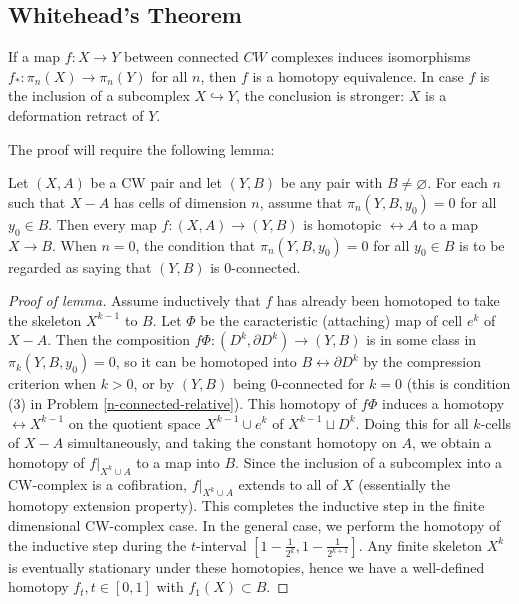 \subsection{Whitehead's Theorem}

\begin{theorem}\label{Thm:Whitehead}
    If a map $f \colon X \to Y$ between connected
    $CW$ complexes induces isomorphisms
    $f_* \colon \pi_n (X) \to \pi_n (Y)$ for all
    $n$, then $f$ is a homotopy equivalence.
    In case $f$ is the inclusion of a subcomplex
    $X \hookrightarrow Y$, the conclusion is stronger:
    $X$ is a deformation retract of $Y$.
\end{theorem}

The proof will require the following lemma:

\begin{lemma}\label{Compression-Lemma}
    Let $\left( X,A \right) $ be a CW pair and let
    $\left( Y, B \right) $ be any pair with
    $B \neq \varnothing$. For each  $n$ such that
    $X - A$ has cells of dimension $n$, assume
    that  $\pi_n \left( Y, B, y_0 \right) = 0$ for
    all $y_0 \in B$. Then every map $f \colon
    \left( X,A \right) \to \left( Y,B \right) $ is homotopic
    $\rel A$ to a map $X \to B$.
    When $n = 0$, the condition that
    $\pi_n \left( Y,B,y_0 \right) =0$ for all
    $y_0 \in B$ is to be regarded as saying that
    $\left( Y,B \right) $ is $0$-connected.
\end{lemma}

\begin{proof}[Proof of lemma]
    Assume inductively that $f$ has already been
    homotoped to take the skeleton
    $X^{k-1}$ to $B$. Let
    $\Phi$ be the caracteristic (attaching) map of 
    cell $e^{k}$ of $X - A$. Then the composition
    $f \Phi \colon \left( D^{k} , \partial D^{k} \right) 
    \to \left( Y,B \right) $ is in some class
    in $\pi_k \left( Y, B, y_0 \right) = 0$, so
    it can be homotoped into $B \rel \partial D^{k}$ by
    the compression criterion when
    $k > 0$, or
    by $\left( Y,B \right) $ being $0$-connected for
    $k = 0$ (this is condition (3) in Problem \ref{n-connected-relative}).
    This homotopy of $f \Phi$ induces a homotopy
    $\rel X^{k-1}$ on the quotient space
    $X^{k-1} \cup e^{k}$ of $X^{k-1} \sqcup D^{k}$.
    Doing this for all $k$-cells of $X-A$ simultaneously, and
    taking the constant homotopy on $A$, we obtain a
    homotopy of $f|_{X^{k} \cup A}$ to a map into
    $B$. Since the inclusion of a
    subcomplex into a CW-complex is a cofibration,
    $f|_{X^{k} \cup  A}$ extends to all of $X$ (essentially
    the homotopy extension property).
    This completes the inductive step in the finite dimensional
    CW-complex case.
    In the general case, we perform the
    homotopy of the inductive step during the
    $t$-interval $\left[ 1- \frac{1}{2^{k}},
    1- \frac{1}{2^{k+1}}\right] $. Any finite skeleton
    $X^{k}$ is eventually stationary under these
    homotopies, hence we have a well-defined
    homotopy $f_t, t \in \left[ 0,1 \right] $ with
    $f_1 (X) \subset B$.
\end{proof}


